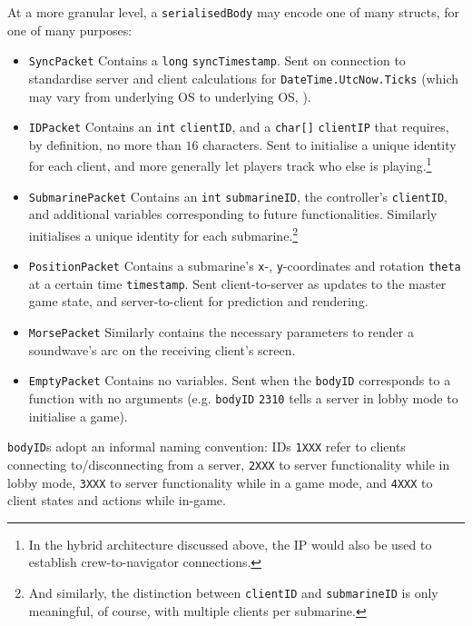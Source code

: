 \documentclass[a4paper, 9pt]{article}
\begin{document}
\begin{flushleft}
\vspace{5pt}\noindent
At a more granular level, a \texttt{serialisedBody} may encode one of many structs, for one of many purposes:
\begin{itemize}[noitemsep]
\item \texttt{SyncPacket} Contains a \texttt{long} \texttt{syncTimestamp}. Sent on connection to standardise server and client calculations for \texttt{DateTime.UtcNow.Ticks} (which may vary from underlying OS to underlying OS, \citealp{msftUTC}).
\item \texttt{IDPacket} Contains an \texttt{int} \texttt{clientID}, and a \texttt{char[]} \texttt{clientIP} that requires, by definition, no more than $16$ characters. Sent to initialise a unique identity for each client, and more generally let players track who else is playing.\footnote{In the hybrid architecture discussed above, the IP would also be used to establish crew-to-navigator connections.}
\item \texttt{SubmarinePacket} Contains an \texttt{int} \texttt{submarineID}, the controller's \texttt{clientID}, and additional variables corresponding to future functionalities. Similarly initialises a unique identity for each submarine.\footnote{And similarly, the distinction between \texttt{clientID} and \texttt{submarineID} is only meaningful, of course, with multiple clients per submarine.}
\item \texttt{PositionPacket} Contains a submarine's \texttt{x}-, \texttt{y}-coordinates and rotation \texttt{theta} at a certain time \texttt{timestamp}. Sent client-to-server as updates to the master game state, and server-to-client for prediction and rendering.
\item \texttt{MorsePacket} Similarly contains the necessary parameters to render a soundwave's arc on the receiving client's screen.
\item \texttt{EmptyPacket} Contains no variables. Sent when the \texttt{bodyID} corresponds to a function with no arguments (e.g. \texttt{bodyID} \texttt{2310} tells a server in lobby mode to initialise a game).
\end{itemize}
\texttt{bodyID}s adopt an informal naming convention: IDs \texttt{1XXX} refer to clients connecting to/disconnecting from a server, \texttt{2XXX} to server functionality while in lobby mode, \texttt{3XXX} to server functionality while in a game mode, and \texttt{4XXX} to client states and actions while in-game.


\end{flushleft}
\end{document}
